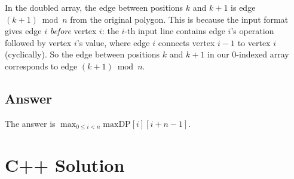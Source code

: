 \documentclass[11pt,a4paper]{article}
\begin{document}
In the doubled array, the edge between positions $k$ and $k+1$ is edge
$(k + 1) \bmod n$ from the original polygon. This is because the input format gives
edge $i$ \emph{before} vertex $i$: the $i$-th input line contains edge $i$'s operation
followed by vertex $i$'s value, where edge $i$ connects vertex $i{-}1$ to vertex $i$
(cyclically). So the edge between positions $k$ and $k+1$ in our 0-indexed array
corresponds to edge $(k+1) \bmod n$.

\subsection{Answer}

The answer is $\max_{0 \le i < n} \mathrm{maxDP}[i][i + n - 1]$.

\section{C++ Solution}
\end{document}
